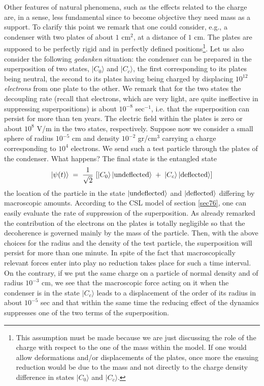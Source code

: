 \documentclass[12pt]{article}
\begin{document}
Other features of natural phenomena, such as the effects related
to the charge are, in a sense, less fundamental since to become
objective they need mass as a support. To clarify this point we
remark that one could consider, e.g., a condenser with two plates
of about $1$ cm$^{2}$, at a distance of $1$ cm. The plates are
supposed to be perfectly rigid and in perfectly defined
positions\footnote{This assumption must be made because we are
just discussing the role of the charge with respect to the one of
the mass within the model. If one would allow deformations and/or
displacements of the plates, once more the ensuing reduction would
be due to the mass and not directly to the charge density
difference in states $|C_{0}\rangle$ and $|C_{c}\rangle$.}. Let us
also consider the following {\it gedanken} situation: the
condenser can be prepared in the superposition of two states,
$|C_{0}\rangle$ and $|C_{c}\rangle$, the first corresponding to
its plates being neutral, the second to its plates having being
charged by displacing $10^{12}$ {\it electrons} from one plate to
the other. We remark that for the two states the decoupling rate
(recall that electrons, which are very light, are quite
ineffective in suppressing superpositions) is about $10^{-8}$
sec$^{-1}$, i.e. that the superposition can persist for more than
ten years. The electric field within the plates is zero or about
$10^{8}$ V/m in the two states, respectively. Suppose now we
consider a small sphere of radius $10^{-5}$ cm and density
$10^{-2}$ gr/cm$^{3}$ carrying a charge corresponding to $10^{4}$
electrons. We send such a test particle through the plates of the
condenser. What
 happens? The final state is the entangled state
\begin{equation}
|\psi(t)\rangle \; = \; \frac{1}{\sqrt{2}}\,\left[|C_{0}\rangle\,
|\makebox{undeflected}\rangle \; + \; |C_{c}\rangle\,
|\makebox{deflected}\rangle \right]
\end{equation}
the location of the particle in the state
$|\makebox{undeflected}\rangle$ and $|\makebox{deflected}\rangle$
differing by macroscopic amounts. According to the CSL model of
section \ref{sec76}, one can easily evaluate the rate of
suppression of the superposition. As already remarked the
contribution of the electrons on the plates is totally negligible
so that the decoherence is governed mainly by the mass of the
particle. Then, with the above choices for the radius and the
density of the test particle, the superposition will persist for
more than one minute. In spite of the fact that macroscopically
relevant forces enter into play no reduction takes place for such
a time interval. On the contrary, if we put the same charge on a
particle of normal density and of radius $10^{-3}$ cm, we see that
the macroscopic force acting on it when the condenser is in the
state $|C_{c}\rangle$ leads to a displacement of the order of its
radius in about $10^{-5}$ sec and that within the same time the
reducing effect of the dynamics suppresses one of the two terms of
the superposition.
\end{document}
